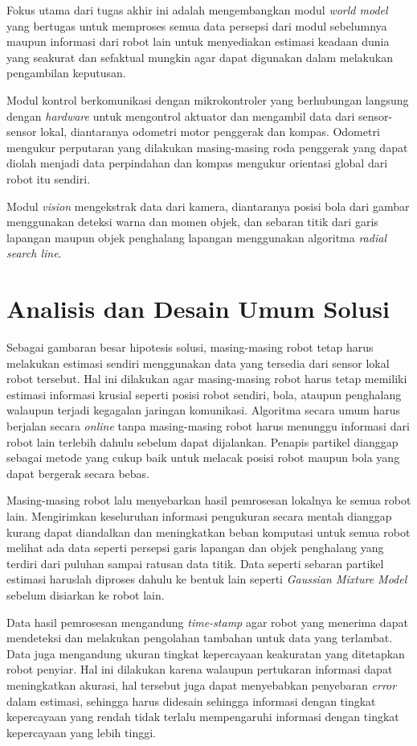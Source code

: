 Fokus utama dari tugas akhir ini adalah mengembangkan modul \textit{world model} yang bertugas untuk memproses semua data persepsi dari modul sebelumnya maupun informasi dari robot lain untuk menyediakan estimasi keadaan dunia yang seakurat dan sefaktual mungkin agar dapat digunakan dalam melakukan pengambilan keputusan.

Modul kontrol berkomunikasi dengan mikrokontroler yang berhubungan langsung dengan \textit{hardware} untuk mengontrol aktuator dan mengambil data dari sensor-sensor lokal, diantaranya odometri motor penggerak dan kompas. Odometri mengukur perputaran yang dilakukan masing-masing roda penggerak yang dapat diolah menjadi data perpindahan dan kompas mengukur orientasi global dari robot itu sendiri.

Modul \textit{vision} mengekstrak data dari kamera, diantaranya posisi bola dari gambar menggunakan deteksi warna dan momen objek, dan sebaran titik dari garis lapangan maupun objek penghalang lapangan menggunakan algoritma \textit{radial search line}.

\section{Analisis dan Desain Umum Solusi}

Sebagai gambaran besar hipotesis solusi, masing-masing robot tetap harus melakukan estimasi sendiri menggunakan data yang tersedia dari sensor lokal robot tersebut. Hal ini dilakukan agar masing-masing robot harus tetap memiliki estimasi informasi krusial seperti posisi robot sendiri, bola, ataupun penghalang walaupun terjadi kegagalan jaringan komunikasi. Algoritma secara umum harus berjalan secara \textit{online} tanpa masing-masing robot harus menunggu informasi dari robot lain terlebih dahulu sebelum dapat dijalankan. Penapis partikel dianggap sebagai metode yang cukup baik untuk melacak posisi robot maupun bola yang dapat bergerak secara bebas.

Masing-masing robot lalu menyebarkan hasil pemrosesan lokalnya ke semua robot lain. Mengirimkan keseluruhan informasi pengukuran secara mentah dianggap kurang dapat diandalkan dan meningkatkan beban komputasi untuk semua robot melihat ada data seperti persepsi garis lapangan dan objek penghalang yang terdiri dari puluhan sampai ratusan data titik. Data seperti sebaran partikel estimasi haruslah diproses dahulu ke bentuk lain seperti \textit{Gaussian Mixture Model} sebelum disiarkan ke robot lain.

Data hasil pemrosesan mengandung \textit{time-stamp} agar robot yang menerima dapat mendeteksi dan melakukan pengolahan tambahan untuk data yang terlambat. Data juga mengandung ukuran tingkat kepercayaan keakuratan yang ditetapkan robot penyiar. Hal ini dilakukan karena walaupun pertukaran informasi dapat meningkatkan akurasi, hal tersebut juga dapat menyebabkan penyebaran \textit{error} dalam estimasi, sehingga harus didesain sehingga informasi dengan tingkat kepercayaan yang rendah tidak terlalu mempengaruhi informasi dengan tingkat kepercayaan yang lebih tinggi.

